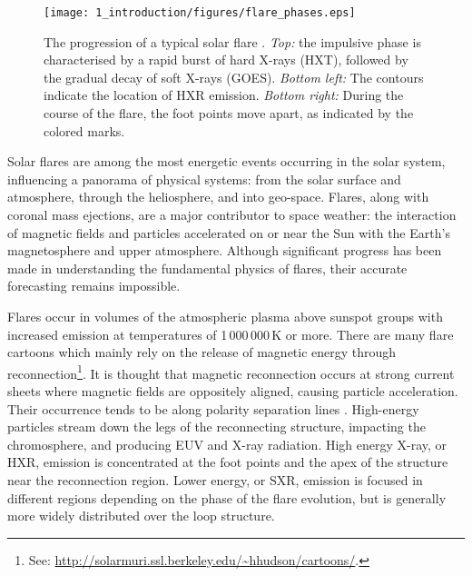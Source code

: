 \begin{figure}[!t]
\centerline{\texttt{[image: 1\_introduction/figures/flare\_phases.eps]}}
\caption[The progression of a typical solar flare.]{The progression of a typical solar flare \citep[from][]{Qiu:2009}. \emph{Top:} the impulsive phase is characterised by a rapid burst of hard X-rays (HXT), followed by the gradual decay of soft X-rays (GOES). \emph{Bottom left:} The contours indicate the location of HXR emission. \emph{Bottom right:} During the course of the flare, the foot points move apart, as indicated by the colored marks.}
\label{fig:flarephase}
\end{figure}

Solar flares are among the most energetic events occurring in the solar system, influencing a panorama of physical systems: from the solar surface and atmosphere, through the heliosphere, and into geo-space. Flares, along with coronal mass ejections, are a major contributor to space weather:  the interaction of magnetic fields and particles accelerated on or near the Sun with the Earth's magnetosphere and upper atmosphere. Although significant progress has been made in understanding the fundamental physics of flares, their accurate forecasting remains impossible.

Flares occur in volumes of the atmospheric plasma above sunspot groups with increased emission at temperatures of 1\,000\,000\,K or more. There are many flare cartoons which mainly rely on the release of magnetic energy through reconnection\footnote{See: \url{http://solarmuri.ssl.berkeley.edu/\~hhudson/cartoons/}.}. 
It is thought that magnetic reconnection occurs at strong current sheets where magnetic fields are oppositely aligned, causing particle acceleration. Their occurrence tends to be along polarity separation lines \citep{Schrijver:2007}. High-energy particles stream down the legs of the reconnecting structure, impacting the chromosphere, and producing \gls{EUV} and X-ray radiation. High energy X-ray, or \gls{HXR}, emission is concentrated at the foot points and the apex of the structure near the reconnection region. Lower energy, or \gls{SXR}, emission is focused in different regions depending on the phase of the flare evolution, but is generally more widely distributed over the loop structure.

